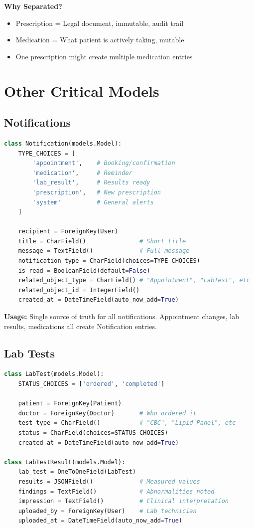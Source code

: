 \documentclass[11pt,a4paper,twoside]{report}
\begin{document}
\textbf{Why Separated?}
\begin{itemize}
    \item Prescription = Legal document, immutable, audit trail
    \item Medication = What patient is actively taking, mutable
    \item One prescription might create multiple medication entries
\end{itemize}

\section{Other Critical Models}

\subsection{Notifications}

\begin{lstlisting}[language=Python]
class Notification(models.Model):
    TYPE_CHOICES = [
        'appointment',    # Booking/confirmation
        'medication',     # Reminder
        'lab_result',     # Results ready
        'prescription',   # New prescription
        'system'          # General alerts
    ]
    
    recipient = ForeignKey(User)
    title = CharField()               # Short title
    message = TextField()             # Full message
    notification_type = CharField(choices=TYPE_CHOICES)
    is_read = BooleanField(default=False)
    related_object_type = CharField() # "Appointment", "LabTest", etc
    related_object_id = IntegerField()
    created_at = DateTimeField(auto_now_add=True)
\end{lstlisting}

\textbf{Usage:} Single source of truth for all notifications. Appointment changes, lab results, medications all create Notification entries.

\subsection{Lab Tests}

\begin{lstlisting}[language=Python]
class LabTest(models.Model):
    STATUS_CHOICES = ['ordered', 'completed']
    
    patient = ForeignKey(Patient)
    doctor = ForeignKey(Doctor)       # Who ordered it
    test_type = CharField()           # "CBC", "Lipid Panel", etc
    status = CharField(choices=STATUS_CHOICES)
    created_at = DateTimeField(auto_now_add=True)

class LabTestResult(models.Model):
    lab_test = OneToOneField(LabTest)
    results = JSONField()             # Measured values
    findings = TextField()            # Abnormalities noted
    impression = TextField()          # Clinical interpretation
    uploaded_by = ForeignKey(User)    # Lab technician
    uploaded_at = DateTimeField(auto_now_add=True)
\end{lstlisting}
\end{document}
